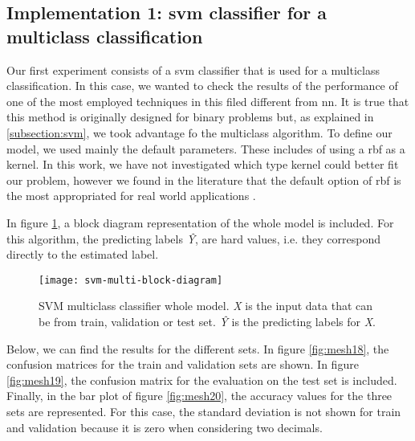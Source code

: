 \subsection{Implementation 1: \acrshort{svm} classifier for a multiclass classification}

	Our first experiment consists of a \acrshort{svm} classifier that is used for a multiclass classification. In this case, we wanted to check the results of the performance of one of the most employed techniques in this filed different from \acrshort{nn}. It is true that this method is originally designed for binary problems but, as explained in \ref{subsection:svm}, we took advantage fo the multiclass algorithm. To define our model, we used mainly the default parameters. These includes of using a \acrshort{rbf} as a kernel. In this work, we have not investigated which type kernel could better fit our problem, however we found in the literature that the default option of \acrshort{rbf} is the most appropriated for real world applications \cite{Prajapati2010}. 
	
	In figure \ref{fig:mesh17}, a block diagram representation of the whole model is included. For this algorithm, the predicting labels \textit{\^{Y}}, are hard values, i.e. they correspond directly to the estimated label. 
	
	\begin{figure}[t]
		\centering
		\captionsetup{justification=centering}
		\texttt{[image: svm-multi-block-diagram]}
		\caption{SVM multiclass classifier whole model. \textit{X} is the input data that can be from train, validation or test set. \textit{\^{Y}} is the predicting labels for \textit{X}.}
		\label{fig:mesh17}
	\end{figure}

	Below, we can find the results for the different sets. In figure \ref{fig:mesh18}, the confusion matrices for the train and validation sets are shown. In figure \ref{fig:mesh19}, the confusion matrix for the evaluation on the test set is included. Finally, in the bar plot of figure \ref{fig:mesh20}, the accuracy values for the three sets are represented. For this case, the standard deviation is not shown for train and validation because it is zero when considering two decimals.
	
